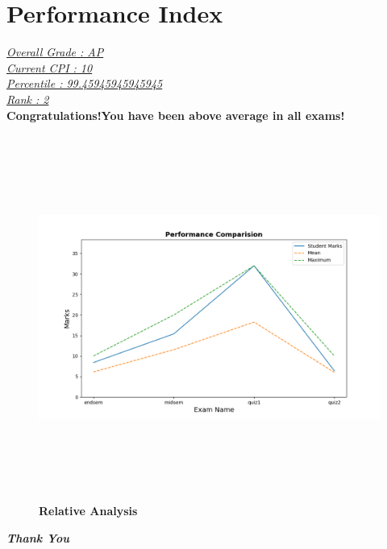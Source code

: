 \documentclass[a4paper, 11pt]{article}
\begin{document}
\section{\fontsize{20}{22}\textbf{Performance Index}}
\vspace{1cm}
{\fontsize{14}{16}\textit{\underline{Overall Grade : \color{darkblue}AP}}}\\
\newline
{\fontsize{14}{16}\textit{\underline{Current CPI : \color{darkblue}10}}}\\
\newline
{\fontsize{14}{16}\textit{\underline{Percentile : \color{darkblue}99.45945945945945}}}\\
\newline
{\fontsize{14}{16}\textit{\underline{Rank : \color{darkblue}2}}}\\
\newline
{\fontsize{14}{14}\textbf{Congratulations!You have been above average in all exams!}}\\
\begin{figure}
    \centering
    \includegraphics[width=12cm,height=12cm]{compare.png}
    \caption{\textbf{Relative Analysis}}
\end{figure}
\vspace{2cm}
\begin{flushright}
    {\fontsize{22}{22}\textit{\textbf{\color{darkblue}Thank You}}}
\end{flushright}
\end{document}
